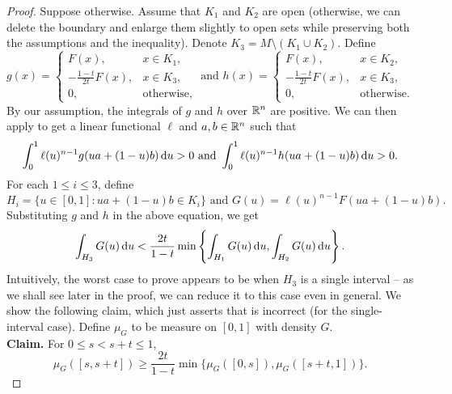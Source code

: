 \begin{proof}
	Suppose otherwise. Assume that $K_1$ and $K_2$ are open (otherwise, we can delete the boundary and enlarge them slightly to open sets while preserving both the assumptions and the inequality). Denote $K_3 = M\setminus(K_1\cup K_2)$. Define
	\[
		g(x) = 
		\begin{cases}
			F(x), & x\in K_1, \\
			-\frac{1-t}{2t}F(x), & x\in K_3, \\
			0, & \text{otherwise},
		\end{cases}
		\text{ and }
		h(x) = 
		\begin{cases}
			F(x), & x\in K_2, \\
			-\frac{1-t}{2t}F(x), & x\in K_3, \\
			0, & \text{otherwise}.
		\end{cases}
	\]
	By our assumption, the integrals of $g$ and $h$ over $\mathbb{R}^n$ are positive. We can then apply  to get a linear functional $\ell$ and $a,b\in\mathbb{R}^n$ such that
	\[ \int_0^1 \ell(u)^{n-1}g(ua+(1-u)b) \operatorname{d}\!{u} > 0 \text{ and } \int_0^1 \ell(u)^{n-1}h(ua+(1-u)b) \operatorname{d}\!{u} > 0. \]
	For each $1\leq i\leq 3$, define
	\[ H_i = \{u\in[0,1] : ua+(1-u)b \in K_i\} \text{ and } G(u) = \ell(u)^{n-1}F(ua+(1-u)b). \]
	Substituting $g$ and $h$ in the above equation, we get
	\begin{equation}
	\label{eqn: cond iso ineq imp contradictory eqn}
		\int_{H_3} G(u)\operatorname{d}\!{u} < \frac{2t}{1-t} \min\left\{\int_{H_1} G(u)\operatorname{d}\!{u}, \int_{H_2} G(u)\operatorname{d}\!{u}\right\}.
	\end{equation}
	Intuitively, the worst case to prove appears to be when $H_3$ is a single interval -- as we shall see later in the proof, we can reduce it to this case even in general. We show the following claim, which just asserts that  is incorrect (for the single-interval case).
	Define $\mu_G$ to be measure on $[0,1]$ with density $G$.\\

	\textbf{Claim.} For $0\leq s < s+t\leq 1$,
	\begin{equation}
	\label{eqn: 4.15}
		\mu_G([s,s+t]) \geq \frac{2t}{1-t} \min\{\mu_G([0,s]),\mu_G([s+t,1])\}.	
	\end{equation}


\end{proof}
